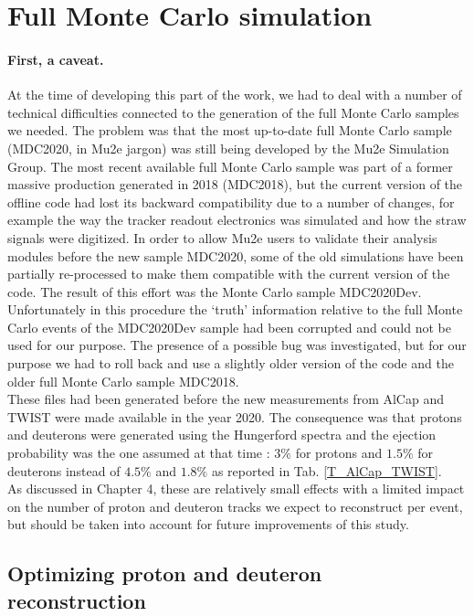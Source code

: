 \documentclass[12pt,a4paper,openright, oneside, titlepage]{book} %
\begin{document}
\section{Full Monte Carlo simulation}

\paragraph{First, a caveat.} 
At the time of developing this part of the work, we had to deal with a number of technical difficulties connected to the generation of the full Monte Carlo samples we needed. 
The problem was that the most up-to-date full Monte Carlo sample (MDC2020, in Mu2e jargon) was still being developed by the Mu2e Simulation Group. 
The most recent available full Monte Carlo sample was part of a former massive production generated in 2018 (MDC2018), but the current version of the offline code had lost its backward compatibility due to a number of changes, for example the way the tracker readout electronics was simulated and how the straw signals were digitized. 
In order to allow Mu2e users to validate their analysis modules before the new sample MDC2020, some of the old simulations have been partially re-processed to make them compatible with the current version of the code. 
The result of this effort was the Monte Carlo sample MDC2020Dev.
Unfortunately in this procedure the `truth' information relative to the full Monte Carlo events of the MDC2020Dev sample had been corrupted and could not be used for our purpose. 
The presence of a possible bug was investigated, but for our purpose we had to roll back and use a slightly older version of the code and the older full Monte Carlo sample MDC2018. \\
These files had been generated before the new measurements from AlCap and TWIST were made available in the year 2020. 
The consequence was that protons and deuterons were generated using the Hungerford spectra and the ejection probability was the one assumed at that time \cite{MDC2018}: $3\%$ for protons and $1.5\%$ for deuterons instead of $4.5\%$ and $1.8\%$ as reported in Tab. \ref{T_AlCap_TWIST}.\\
As discussed in Chapter 4, these are relatively small effects with a limited impact on the number of proton and deuteron tracks we expect to reconstruct per event, but should be taken into account for future improvements of this study.


\subsection{Optimizing proton and deuteron reconstruction}
\end{document}
